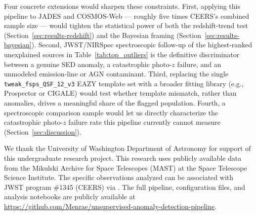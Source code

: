 \documentclass[twocolumn]{aastex631}
\begin{document}
Four concrete extensions would sharpen these constraints. First, applying
this pipeline to JADES and COSMOS-Web --- roughly five times CEERS's
combined sample size --- would tighten the statistical power of both the
redshift-trend test (Section~\ref{sec:results-redshift}) and the Bayesian
framing (Section~\ref{sec:results-bayesian}). Second, JWST/NIRSpec
spectroscopic follow-up of the highest-ranked unexplained sources in
Table~\ref{tab:top_outliers} is the definitive discriminator between a
genuine SED anomaly, a catastrophic photo-$z$ failure, and an unmodeled
emission-line or AGN contaminant. Third, replacing the single
\texttt{tweak\_fsps\_QSF\_12\_v3} EAZY template set with a broader
fitting library (e.g., Prospector or CIGALE) would test whether template
mismatch, rather than anomalies, drives a meaningful share of the
flagged population. Fourth, a spectroscopic comparison sample would let us
directly characterize the catastrophic photo-$z$ failure rate this
pipeline currently cannot measure (Section~\ref{sec:discussion}).

\begin{acknowledgments}

We thank the University of Washington Department of Astronomy for support
of this undergraduate research project. This research uses publicly
available data from the Mikulski Archive for Space Telescopes (MAST) at
the Space Telescope Science Institute. The specific observations analyzed
can be associated with JWST program \#1345 (CEERS) via
. The full pipeline,
configuration files, and analysis notebooks are publicly available at
\url{https://github.com/Menrae/unsupervised-anomaly-detection-pipeline}.

\end{acknowledgments}




\end{document}
